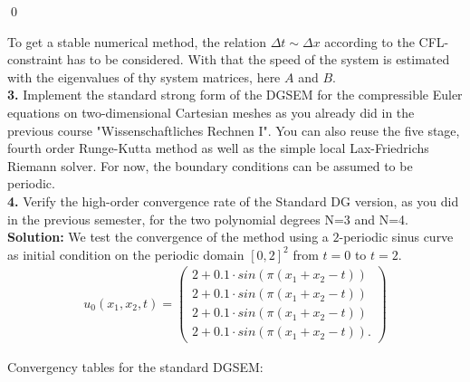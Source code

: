 \documentclass[11pt]{scrartcl}
\begin{document}
\qed

To get a stable numerical method, the relation $\Delta t \sim \Delta x $ according to the CFL-constraint has to be considered. With that the speed of the system is estimated with the eigenvalues of thy system matrices, here $A$ and $B$.  \\


\textbf{3.} Implement the standard strong form of the DGSEM for the compressible Euler equations on two-dimensional Cartesian meshes as you already did in the previous course "Wissenschaftliches Rechnen I". You can also reuse the five stage, fourth order Runge-Kutta method as well as the simple local Lax-Friedrichs Riemann solver. For now, the boundary conditions can be assumed to be periodic. \\

\textbf{4.} Verify the high-order convergence rate of the Standard DG version, as you did in the previous semester, for the two polynomial degrees N=3 and N=4. \\
\newline
\textbf{Solution:} We test the convergence of the method using a $2$-periodic sinus curve as initial condition on the periodic domain $[0, 2]^2$ from $t=0$ to $t=2$.
\begin{align}
u_0(x_1, x_2, t) = 
\begin{pmatrix}
2 + 0.1 \cdot sin( \pi (x_1 + x_2 - t)) \\
2 + 0.1 \cdot sin( \pi (x_1 + x_2 - t)) \\
2 + 0.1 \cdot sin( \pi (x_1 + x_2 - t)) \\
2 + 0.1 \cdot sin( \pi (x_1 + x_2 - t)).
\end{pmatrix}
\label{Anfangsbedingung Konvergenz}
\end{align}

Convergency tables for the standard DGSEM:
\end{document}
